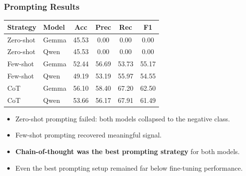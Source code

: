 \documentclass[11pt]{beamer}
\begin{document}
	\begin{frame}
		\frametitle{Prompting Results}
		\begin{table}
			\centering
			\scriptsize
			\begin{tabular}{llcccc}
				\toprule
				\textbf{Strategy} & \textbf{Model} & \textbf{Acc} & \textbf{Prec} & \textbf{Rec} & \textbf{F1} \\
				\midrule
				Zero-shot & Gemma & 45.53 & 0.00 & 0.00 & 0.00 \\
				Zero-shot & Qwen & 45.53 & 0.00 & 0.00 & 0.00 \\
				Few-shot & Gemma & 52.44 & 56.69 & 53.73 & 55.17 \\
				Few-shot & Qwen & 49.19 & 53.19 & 55.97 & 54.55 \\
				CoT & Gemma & 56.10 & 58.40 & 67.20 & 62.50 \\
				CoT & Qwen & 53.66 & 56.17 & 67.91 & 61.49 \\
				\bottomrule
			\end{tabular}
		\end{table}
		
		\begin{itemize}
			\item Zero-shot prompting failed: both models collapsed to the negative class.
			\item Few-shot prompting recovered meaningful signal.
			\item \textbf{Chain-of-thought was the best prompting strategy} for both models.
			\item Even the best prompting setup remained far below fine-tuning performance.
		\end{itemize}
	\end{frame}
	
\end{document}
